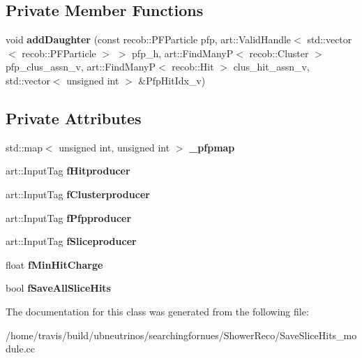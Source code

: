 \subsection*{Private Member Functions}
\begin{DoxyCompactItemize}
\item 
void {\bfseries add\+Daughter} (const recob\+::\+P\+F\+Particle pfp, art\+::\+Valid\+Handle$<$ std\+::vector$<$ recob\+::\+P\+F\+Particle $>$ $>$ pfp\+\_\+h, art\+::\+Find\+ManyP$<$ recob\+::\+Cluster $>$ pfp\+\_\+clus\+\_\+assn\+\_\+v, art\+::\+Find\+ManyP$<$ recob\+::\+Hit $>$ clus\+\_\+hit\+\_\+assn\+\_\+v, std\+::vector$<$ unsigned int $>$ \&Pfp\+Hit\+Idx\+\_\+v)\hypertarget{classSaveSliceHits_a13bfe5d175be84fe7b949a967a5da465}{}\label{classSaveSliceHits_a13bfe5d175be84fe7b949a967a5da465}

\end{DoxyCompactItemize}
\subsection*{Private Attributes}
\begin{DoxyCompactItemize}
\item 
std\+::map$<$ unsigned int, unsigned int $>$ {\bfseries \+\_\+pfpmap}\hypertarget{classSaveSliceHits_a4a8537787643bd309b910620bcb2e154}{}\label{classSaveSliceHits_a4a8537787643bd309b910620bcb2e154}

\item 
art\+::\+Input\+Tag {\bfseries f\+Hitproducer}\hypertarget{classSaveSliceHits_a6a289d782481d17dc39c931d62d0f31c}{}\label{classSaveSliceHits_a6a289d782481d17dc39c931d62d0f31c}

\item 
art\+::\+Input\+Tag {\bfseries f\+Clusterproducer}\hypertarget{classSaveSliceHits_a4e6d5a3f1ab4ddc732f5758a3759effa}{}\label{classSaveSliceHits_a4e6d5a3f1ab4ddc732f5758a3759effa}

\item 
art\+::\+Input\+Tag {\bfseries f\+Pfpproducer}\hypertarget{classSaveSliceHits_ac2f381959f9bc912590888c6a86c8965}{}\label{classSaveSliceHits_ac2f381959f9bc912590888c6a86c8965}

\item 
art\+::\+Input\+Tag {\bfseries f\+Sliceproducer}\hypertarget{classSaveSliceHits_a942b1c4ea132e951aa39637e2f5d3e21}{}\label{classSaveSliceHits_a942b1c4ea132e951aa39637e2f5d3e21}

\item 
float {\bfseries f\+Min\+Hit\+Charge}\hypertarget{classSaveSliceHits_a68cfd0c337276c49f781fa06495effb1}{}\label{classSaveSliceHits_a68cfd0c337276c49f781fa06495effb1}

\item 
bool {\bfseries f\+Save\+All\+Slice\+Hits}\hypertarget{classSaveSliceHits_a5639bb2f98134427e3ece9fcf5d21de8}{}\label{classSaveSliceHits_a5639bb2f98134427e3ece9fcf5d21de8}

\end{DoxyCompactItemize}


The documentation for this class was generated from the following file\+:\begin{DoxyCompactItemize}
\item 
/home/travis/build/ubneutrinos/searchingfornues/\+Shower\+Reco/Save\+Slice\+Hits\+\_\+module.\+cc\end{DoxyCompactItemize}
